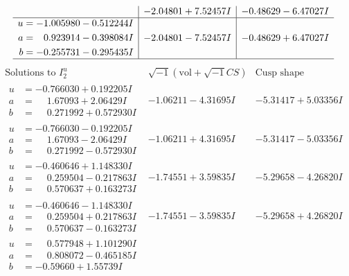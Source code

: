\documentclass[1p]{elsarticle_modified}
\theoremstyle{definition}
\newcommand{\I}{\sqrt{-1}}
\begin{document}
$$\begin{array}{c|c|c}
 & -2.04801 + 7.52457 I & -0.48629 - 6.47027 I \\ \hline\begin{aligned}
u &= -1.005980 - 0.512244 I \\
a &= \phantom{-}0.923914 - 0.398084 I \\
b &= -0.255731 - 0.295435 I\end{aligned}
 & -2.04801 - 7.52457 I & -0.48629 + 6.47027 I\\
 \hline 
 \end{array}$$\newpage$$\begin{array}{c|c|c}  
\text{Solutions to }I^u_{2}& \I (\text{vol} + \sqrt{-1}CS) & \text{Cusp shape}\\
 \hline 
\begin{aligned}
u &= -0.766030 + 0.192205 I \\
a &= \phantom{-}1.67093 + 2.06429 I \\
b &= \phantom{-}0.271992 + 0.572930 I\end{aligned}
 & -1.06211 - 4.31695 I & -5.31417 + 5.03356 I \\ \hline\begin{aligned}
u &= -0.766030 - 0.192205 I \\
a &= \phantom{-}1.67093 - 2.06429 I \\
b &= \phantom{-}0.271992 - 0.572930 I\end{aligned}
 & -1.06211 + 4.31695 I & -5.31417 - 5.03356 I \\ \hline\begin{aligned}
u &= -0.460646 + 1.148330 I \\
a &= \phantom{-}0.259504 - 0.217863 I \\
b &= \phantom{-}0.570637 + 0.163273 I\end{aligned}
 & -1.74551 + 3.59835 I & -5.29658 - 4.26820 I \\ \hline\begin{aligned}
u &= -0.460646 - 1.148330 I \\
a &= \phantom{-}0.259504 + 0.217863 I \\
b &= \phantom{-}0.570637 - 0.163273 I\end{aligned}
 & -1.74551 - 3.59835 I & -5.29658 + 4.26820 I \\ \hline\begin{aligned}
u &= \phantom{-}0.577948 + 1.101290 I \\
a &= \phantom{-}0.808072 - 0.465185 I \\
b &= -0.59660 + 1.55739 I\end{aligned}

\end{array}$$
\end{document}

